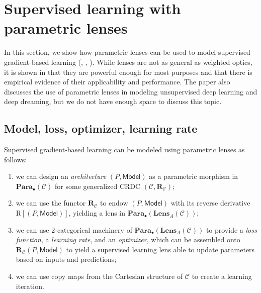 \documentclass[11pt,a4paper,openright,twoside]{report}
\theoremstyle{plain}
\theoremstyle{definition}
\begin{document}
\section{Supervised learning with parametric lenses}
\label{sec: opticbasedlearning}

In this section, we show how parametric lenses can be used to model supervised gradient-based learning (\cite{cruttwell2022categorical}, \cite{gavranovic2024fundamental}, \cite{shiebler2021category}). While lenses are not as general as weighted optics, it is shown in \cite{cruttwell2022categorical} that they are powerful enough for most purposes and that there is empirical evidence of their applicability and performance. The paper also discusses the use of parametric lenses in modeling unsupervised deep learning and deep dreaming, but we do not have enough space to discuss this topic.

\subsection{Model, loss, optimizer, learning rate}

Supervised gradient-based learning can be modeled using parametric lenses as follows:
\begin{enumerate}
  \item  we can design an \textit{architecture} $(P,\mathsf{Model})$ as a parametric morphism in $\mathbf{Para}_{\bullet}(\mathcal{C})$ for some generalized CRDC $(\mathcal{C},\mathbf{R}_{\mathcal{C}})$;
  \item we can use the functor $\mathbf{R}_{\mathcal{C}}$ to endow $(P,\mathsf{Model})$ with its reverse derivative $\mathrm{R}[(P,\mathsf{Model})]$, yielding a lens in $\mathbf{Para}_{\bullet}(\mathbf{Lens}_A(\mathcal{C}))$;
  \item we can use $2$-categorical machinery of $\mathbf{Para}_{\bullet}(\mathbf{Lens}_A(\mathcal{C}))$ to provide a \textit{loss function}, a \textit{learning rate}, and an \textit{optimizer}, which can be assembled onto $\mathbf{R}_{\mathcal{C}}(P,\mathsf{Model})$ to yield a supervised learning lens able to update parameters based on inputs and predictions;
  \item we can use copy maps from the Cartesian structure of $\mathcal{C}$ to create a learning iteration.
\end{enumerate}
\end{document}
